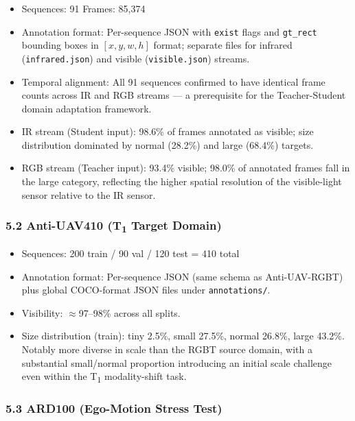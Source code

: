 \begin{itemize}
    \item Sequences: 91 \quad Frames: 85,374
    \item Annotation format: Per-sequence JSON with \texttt{exist}
          flags and \texttt{gt\_rect} bounding boxes in $[x, y, w, h]$
          format; separate files for infrared (\texttt{infrared.json}) and
          visible (\texttt{visible.json}) streams.
    \item Temporal alignment: All 91 sequences confirmed to have
          identical frame counts across IR and RGB streams — a prerequisite
          for the Teacher-Student domain adaptation framework.
    \item IR stream (Student input): 98.6\% of frames annotated
          as visible; size distribution dominated by normal
          (28.2\%) and large (68.4\%) targets.
    \item RGB stream (Teacher input): 93.4\% visible;
          98.0\% of annotated frames fall in the large category,
          reflecting the higher spatial resolution of the visible-light
          sensor relative to the IR sensor.
\end{itemize}

\subsubsection*{5.2 Anti-UAV410 (T\textsubscript{1} Target Domain)}

\begin{itemize}
    \item Sequences: 200 train / 90 val / 120 test = 410 total
    \item Annotation format: Per-sequence JSON (same schema as
          Anti-UAV-RGBT) plus global COCO-format JSON files under
          \texttt{annotations/}.
    \item Visibility: $\approx$97--98\% across all splits.
    \item Size distribution (train): tiny 2.5\%, small 27.5\%,
          normal 26.8\%, large 43.2\%. Notably more diverse in scale
          than the RGBT source domain, with a substantial small/normal
          proportion introducing an initial scale challenge even within
          the T\textsubscript{1} modality-shift task.
\end{itemize}

\subsubsection*{5.3 ARD100 (Ego-Motion Stress Test)}

